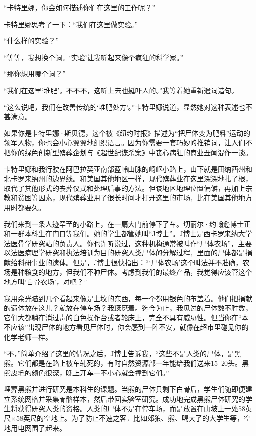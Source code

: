 \documentclass[12pt,oneside]{book}
\begin{document}
“卡特里娜，你会如何描述你们在这里的工作呢？”

卡特里娜思考了一下：“我们在这里做实验。”

“什么样的实验？”

“等等，我想换个词。‘实验’让我听起来像个疯狂的科学家。”

“那你想用哪个词？”

“我们在这里‘堆肥’。不不不，这听上去也挺吓人的。”我等着她重新遣词造句。

“这么说吧，我们在改善传统的‘堆肥处方’。”卡特里娜说道，显然她对这种表述也不甚满意。

如果你是卡特里娜·斯贝德，这个被《纽约时报》描述为“把尸体变为肥料”运动的领军人物，你也会小心翼翼地组织语言。因为你需要一套巧妙的推销词，让人们不把你的绿色创新型殡葬企划与《超世纪谍杀案》中丧心病狂的商业丑闻混作一谈。

卡特里娜和我行驶在阿巴拉契亚南部蓝岭山脉的崎岖小路上，山下就是田纳西州和北卡罗来纳州的边界线。和美国其他地区一样，现代殡葬业在这里深深地扎了根，取代了其他形式的丧葬仪式和处理后事的方法。但该地区地理位置偏僻，再加上宗教和贫困等因素，现代殡葬业用了很长时间才打开这里的市场，比在美国其他地方用时都要久。

我们来到一条人迹罕至的小路上，在一扇大门前停下了车。切丽尔·约翰逊博士正和一群本科生在门口等我们。她的学生都管她叫“J博士”。J博士是西卡罗来纳大学法医骨学研究站的负责人。你也许听说过，这种机构通常被叫作“尸体农场”，主要以法医病理学研究和执法培训为目的研究人类尸体的分解过程，里面的尸体都是捐献给科研事业的遗体。但是，J博士很快指出：“‘尸体农场’这个叫法并不准确，农场是种粮食的地方，但我们不种尸体。考虑到我们的最终产品，我觉得应该管这个地方叫‘白骨农场’，对吧？”

我用余光瞄到几个看起来像是土坟的东西，每一个都用银色的布盖着。他们把捐献的遗体放在这儿？就放在停车场？我琢磨着。迄今为止，我见过的尸体数不胜数，它们大都躺在消过毒的白色操作台或者轮床上，完全不具有威胁性。但当你在“本不应该”出现尸体的地方看见尸体时，你会感到一阵不安，就像在超市里碰见你的化学老师一样。

“不，”简单介绍了这里的情况之后，J博士告诉我，“这些不是人类的尸体，是黑熊。它们都是在路上被车轧死的，有时自然资源部一年能给我们送来15~20头。黑熊皮毛的颜色很深，晚上开车一不小心就会撞到它们。”

埋葬黑熊并进行研究是本科生的课题。当熊的尸体只剩下白骨后，学生们随即便建立系统网格并采集骨骼样本，然后带回实验室研究。成功地完成黑熊尸体研究的学生将获得研究人类的资格。人类的尸体不是在停车场，而是放置在山坡上一处58英尺×58英尺的空地上。为了防止不速之客，比如郊狼、熊、喝大了的大学生等，空地用电网围了起来。
\end{document}
